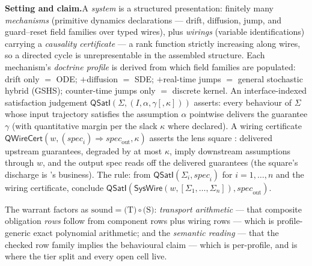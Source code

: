 

\textbf{Setting and claim.}\enspace A \emph{system} is a structured
presentation: finitely many \emph{mechanisms} (primitive dynamics
declarations --- drift, diffusion, jump, and guard--reset field
families over typed wires), plus \emph{wirings} (variable
identifications) carrying a \emph{causality certificate} --- a rank
function strictly increasing along wires, so a directed cycle is
unrepresentable in the assembled structure. Each mechanism's
\emph{doctrine profile} is derived from which field families are
populated: drift only $=$ ODE; $+$diffusion $=$ SDE; $+$real-time
jumps $=$ general stochastic hybrid (GSHS); counter-time jumps only
$=$ discrete kernel. An interface-indexed satisfaction judgement
$\mathsf{QSatI}(\Sigma, (I, \alpha, \gamma[, \kappa]))$ asserts: every
behaviour of $\Sigma$ whose input trajectory satisfies the assumption
$\alpha$ pointwise delivers the guarantee $\gamma$ (with quantitative
margin per the slack $\kappa$ where declared). A wiring certificate
$\mathsf{QWireCert}(w, (\mathit{spec}_i) \Rightarrow
\mathit{spec}_{\mathrm{out}}, \kappa)$ asserts the lens square
\cite{capuccimyers2026}: delivered upstream guarantees, degraded by at
most $\kappa$, imply downstream assumptions through $w$, and the
output spec reads off the delivered guarantees (the square's discharge
is 's business). The rule: from
$\mathsf{QSatI}(\Sigma_i, \mathit{spec}_i)$ for $i = 1, \dots, n$ and
the wiring certificate, conclude
$\mathsf{QSatI}(\mathsf{SysWire}(w, [\Sigma_1, \ldots, \Sigma_n]),
\mathit{spec}_{\mathrm{out}})$.

The warrant factors as
$\mathrm{sound} = \text{(T)} \circ \text{(S)}$: \emph{transport
arithmetic} --- that composite obligation \emph{rows} follow from
component rows plus wiring rows --- which is profile-generic exact
polynomial arithmetic; and the \emph{semantic reading} --- that the
checked row family implies the behavioural claim --- which is
per-profile, and is where the tier split and every open cell live.

